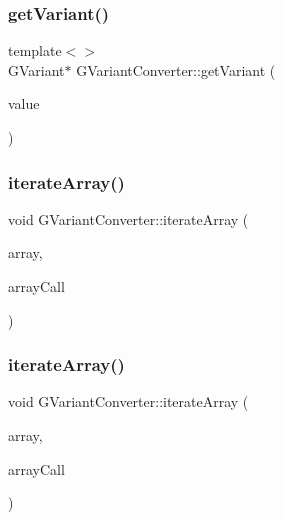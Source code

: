 \mbox{\label{namespaceGVariantConverter_ac9970583f14639ff1f3dfc246e427e94}} 
\subsubsection{\texorpdfstring{get\+Variant()}{getVariant()}\hspace{0.1cm}{\footnotesize\ttfamily [5/5]}}
{\footnotesize\ttfamily template$<$$>$ \\
G\+Variant$\ast$ G\+Variant\+Converter\+::get\+Variant (\begin{DoxyParamCaption}\item[{String\+Array}]{value }\end{DoxyParamCaption})}

\mbox{\label{namespaceGVariantConverter_aa4f289933a9e323d7bceb6b3bf375eb7}} 
\subsubsection{\texorpdfstring{iterate\+Array()}{iterateArray()}\hspace{0.1cm}{\footnotesize\ttfamily [1/2]}}
{\footnotesize\ttfamily void G\+Variant\+Converter\+::iterate\+Array (\begin{DoxyParamCaption}\item[{G\+Variant $\ast$}]{array,  }\item[{std\+::function$<$ void(G\+Variant $\ast$)$>$}]{array\+Call }\end{DoxyParamCaption})}

\mbox{\label{namespaceGVariantConverter_ac105645f6bace764cca896fe105e0f00}} 
\subsubsection{\texorpdfstring{iterate\+Array()}{iterateArray()}\hspace{0.1cm}{\footnotesize\ttfamily [2/2]}}
{\footnotesize\ttfamily void G\+Variant\+Converter\+::iterate\+Array (\begin{DoxyParamCaption}\item[{G\+Variant $\ast$}]{array,  }\item[{std\+::function$<$ void(G\+Variant $\ast$) $>$}]{array\+Call }\end{DoxyParamCaption})}


